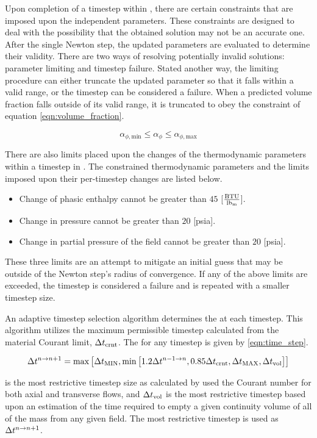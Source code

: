 Upon completion of a timestep within \cobra{}, there are certain constraints that are imposed upon the independent parameters.
These constraints are designed to deal with the possibility that the obtained solution may not be an accurate one.
After the single Newton step, the updated parameters are evaluated to determine their validity.
There are two ways of resolving potentially invalid solutions: parameter limiting and timestep failure.
Stated another way, the limiting procedure can either truncate the updated parameter so that it falls within a valid range, or the timestep can be considered a failure.
When a predicted volume fraction falls outside of its valid range, it is truncated to obey the constraint of equation \eqref{eqn:volume_fraction}.

\begin{equation}
\label{eqn:volume_fraction}
\alpha_{\phi,\text{min}} \leq \alpha_{\phi} \leq \alpha_{\phi,\text{max}} 
\end{equation}

There are also limits placed upon the changes of the thermodynamic parameters within a timestep in \cobra{}.
The constrained thermodynamic parameters and the limits imposed upon their per-timestep changes are listed below.

\begin{itemize}
\item{Change of phasic enthalpy cannot be greater than $45$ [$\frac{\text{BTU}}{\lbm{}}$].}
\item{Change in pressure cannot be greater than $20$ [psia].}
\item{Change in partial pressure of the \ncg{} field cannot be greater than $20$ [psia].}
\end{itemize}

These three limits are an attempt to mitigate an initial guess that may be outside of the Newton step's radius of convergence.
If any of the above limits are exceeded, the timestep is considered a failure and is repeated with a smaller timestep size.

An adaptive timestep selection algorithm determines the \dt{} at each timestep.
This algorithm utilizes the maximum permissible timestep calculated from the material Courant limit, $\dtcrnt{}$.
The \dt{} for any timestep is given by \eqref{eqn:time_step}.

\begin{equation}
\label{eqn:time_step}
\dt{}^{n \rightarrow n+1} = \max\left[ \dt{}_{\text{MIN}}, \min\left[1.2 \dt{}^{n-1 \rightarrow n}, 0.85 \dtcrnt{}, \dtmax{}, \dt{}_{\text{vol}} \right]\right]
\end{equation}

\dtcrnt{} is the most restrictive timestep size as calculated by used the Courant number for both axial and transverse flows, and $\dt{}_{\text{vol}}$ is the most restrictive timestep based upon an estimation of the time required to empty a given continuity volume of all of the mass from any given field.
The most restrictive timestep is used as $\dt{}^{n \rightarrow n+1}$.
